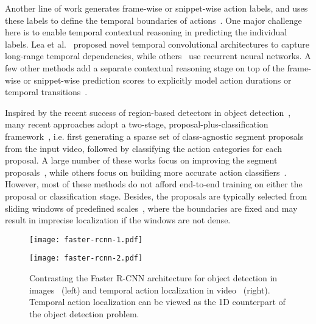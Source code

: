 \documentclass[10pt,twocolumn,letterpaper]{article}
\begin{document}
Another line of work generates frame-wise or
snippet-wise action labels, and uses these labels to define the temporal
boundaries of
actions~\cite{ma:cvpr2016,singh:cvpr2016,dave:cvpr2017,lea:cvpr2017,yuan:cvpr2017,hou:bmvc2017}.
One major challenge here is to enable temporal contextual reasoning in
predicting the individual labels. Lea et al.~\cite{lea:cvpr2017} proposed novel
temporal convolutional architectures to capture long-range temporal
dependencies, while others~\cite{ma:cvpr2016,singh:cvpr2016,dave:cvpr2017} use
recurrent neural networks. A few other methods add a separate contextual
reasoning stage on top of the frame-wise or snippet-wise prediction scores to
explicitly model action durations or temporal
transitions~\cite{richard:cvpr2016,yuan:cvpr2017,hou:bmvc2017}.

Inspired by the recent success of region-based detectors in object
detection~\cite{girshick:cvpr2014,girshick:iccv2015}, many recent approaches
adopt a two-stage, proposal-plus-classification
framework~\cite{caba_heilbron:cvpr2016,shou:cvpr2016,escorcia:eccv2016,buch:cvpr2017,caba_heilbron:cvpr2017,shou:cvpr2017,zhao:iccv2017},
i.e. first generating a sparse set of class-agnostic segment proposals from the
input video, followed by classifying the action categories for each proposal.
A large number of these works focus on improving the segment
proposals~\cite{caba_heilbron:cvpr2016,escorcia:eccv2016,caba_heilbron:cvpr2017,buch:cvpr2017},
while others focus on building more accurate action
classifiers~\cite{shou:cvpr2017,zhao:iccv2017}. However, most of these methods
do not afford end-to-end training on either the proposal or classification
stage. Besides, the proposals are typically selected from sliding windows of
predefined scales~\cite{shou:cvpr2016}, where the boundaries are fixed and may
result in imprecise localization if the windows are not dense.



\begin{figure*}[t]
\centering
 \begin{minipage}{0.48\textwidth}
  \centering
  \texttt{[image: faster-rcnn-1.pdf]}
 \end{minipage}
 \begin{minipage}{0.48\textwidth}
  \centering
  \texttt{[image: faster-rcnn-2.pdf]}
 \end{minipage}
\caption{\small Contrasting the Faster R-CNN architecture for object detection
in images~\cite{ren:nips2015} (left) and temporal action localization in
video~\cite{gao:bmvc2017,dai:iccv2017,gao:iccv2017,xu:iccv2017} (right).
Temporal action localization can be viewed as the 1D counterpart of the object
detection problem.}
\label{fig:faster_r-cnn}
\end{figure*}
\end{document}
